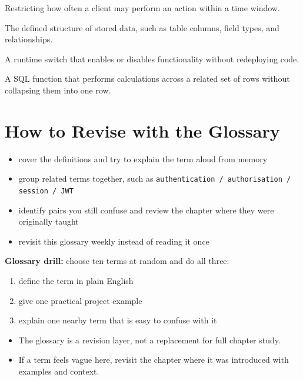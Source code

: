 \documentclass[12pt, a4paper, oneside]{book}
\begin{document}
\begin{description}[leftmargin=2em, style=nextline]
    \item[Rate Limiting] Restricting how often a client may perform an action within a time window.
    \item[Schema] The defined structure of stored data, such as table columns, field types, and relationships.
    \item[Feature Flag] A runtime switch that enables or disables functionality without redeploying code.
    \item[Window Function] A SQL function that performs calculations across a related set of rows without collapsing them into one row.
\end{description}

\section{How to Revise with the Glossary}

\begin{itemize}[leftmargin=2em]
    \item cover the definitions and try to explain the term aloud from memory
    \item group related terms together, such as \texttt{authentication / authorisation / session / JWT}
    \item identify pairs you still confuse and review the chapter where they were originally taught
    \item revisit this glossary weekly instead of reading it once
\end{itemize}

\begin{exercisebox}
\textbf{Glossary drill:} choose ten terms at random and do all three:
\begin{enumerate}[leftmargin=2em]
    \item define the term in plain English
    \item give one practical project example
    \item explain one nearby term that is easy to confuse with it
\end{enumerate}
\end{exercisebox}

\begin{summarybox}
\begin{itemize}[leftmargin=2em]
    \item The glossary is a revision layer, not a replacement for full chapter study.
    \item If a term feels vague here, revisit the chapter where it was introduced with examples and context.
\end{itemize}
\end{summarybox}
\end{document}
